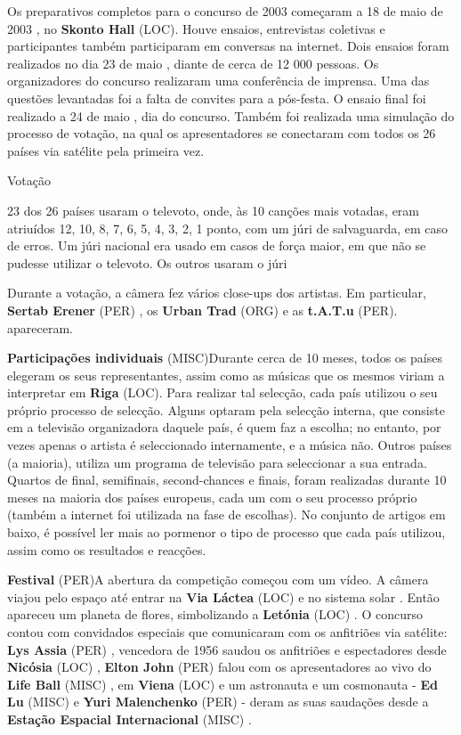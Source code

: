 \documentclass[12pt,a4paper]{article}
\begin{document}
Os preparativos completos para o concurso de 2003 começaram a 18 de maio de 2003 , no \textbf{Skonto Hall} (LOC). Houve ensaios, entrevistas coletivas e participantes também participaram em conversas na internet. Dois ensaios foram realizados no dia 23 de maio , diante de cerca de 12 000 pessoas. Os organizadores do concurso realizaram uma conferência de imprensa. Uma das questões levantadas foi a falta de convites para a pós-festa. O ensaio final foi realizado a 24 de maio , dia do concurso. Também foi realizada uma simulação do processo de votação, na qual os apresentadores se conectaram com todos os 26 países via satélite pela primeira vez.



Votação

23 dos 26 países usaram o televoto, onde, às 10 canções mais votadas, eram atriuídos 12, 10, 8, 7, 6, 5, 4, 3, 2, 1 ponto, com um júri de salvaguarda, em caso de erros. Um júri nacional era usado em casos de força maior, em que não se pudesse utilizar o televoto. Os outros usaram o júri

Durante a votação, a câmera fez vários close-ups dos artistas. Em particular, \textbf{Sertab Erener} (PER) , os \textbf{Urban Trad} (ORG) e as \textbf{t.A.T.u} (PER). apareceram.



\textbf{Participações individuais} (MISC)Durante cerca de 10 meses, todos os países elegeram os seus representantes, assim como as músicas que os mesmos viriam a interpretar em \textbf{Riga} (LOC). Para realizar tal selecção, cada país utilizou o seu próprio processo de selecção. Alguns optaram pela selecção interna, que consiste em a televisão organizadora daquele país, é quem faz a escolha; no entanto, por vezes apenas o artista é seleccionado internamente, e a música não. Outros países (a maioria), utiliza um programa de televisão para seleccionar a sua entrada. Quartos de final, semifinais, second-chances e finais, foram realizadas durante 10 meses na maioria dos países europeus, cada um com o seu processo próprio (também a internet foi utilizada na fase de escolhas). No conjunto de artigos em baixo, é possível ler mais ao pormenor o tipo de processo que cada país utilizou, assim como os resultados e reacções.



\textbf{Festival} (PER)A abertura da competição começou com um vídeo. A câmera viajou pelo espaço até entrar na \textbf{Via Láctea} (LOC) e no sistema solar . Então apareceu um planeta de flores, simbolizando a \textbf{Letónia} (LOC) . O concurso contou com convidados especiais que comunicaram com os anfitriões via satélite: \textbf{Lys Assia} (PER) , vencedora de 1956 saudou os anfitriões e espectadores desde \textbf{Nicósia} (LOC) , \textbf{Elton John} (PER) falou com os apresentadores ao vivo do \textbf{Life Ball} (MISC) , em \textbf{Viena} (LOC) e um astronauta e um cosmonauta - \textbf{Ed Lu} (MISC) e \textbf{Yuri Malenchenko} (PER) - deram as suas saudações desde a \textbf{Estação Espacial Internacional} (MISC) .
\end{document}
